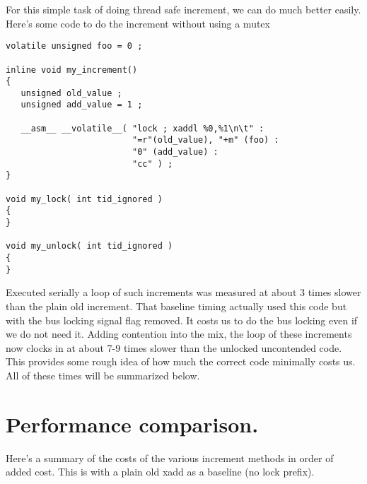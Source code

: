 For this simple task of doing thread safe increment, we can do much better easily.  Here's some code to do the increment without using a mutex

\begin{lstlisting}
volatile unsigned foo = 0 ;

inline void my_increment()
{
   unsigned old_value ;
   unsigned add_value = 1 ;

   __asm__ __volatile__( "lock ; xaddl %0,%1\n\t" :
                         "=r"(old_value), "+m" (foo) :
                         "0" (add_value) :
                         "cc" ) ;
}

void my_lock( int tid_ignored )
{
}

void my_unlock( int tid_ignored )
{
}
\end{lstlisting}

Executed serially a loop of such increments was measured at about 3 times slower than the plain old increment.  That baseline timing actually used this code but with the bus locking signal flag removed.  It costs us to do the bus locking even if we do not need it.  Adding contention into the mix, the loop of these increments now clocks in at about 7-9 times slower than the unlocked uncontended code.  This provides some rough idea of how much the correct code minimally costs us.  All of these times will be summarized below.


\section{Performance comparison.}

Here's a summary of the costs of the various increment methods in order of added cost.  This is with a plain old xadd as a baseline (no lock prefix).

